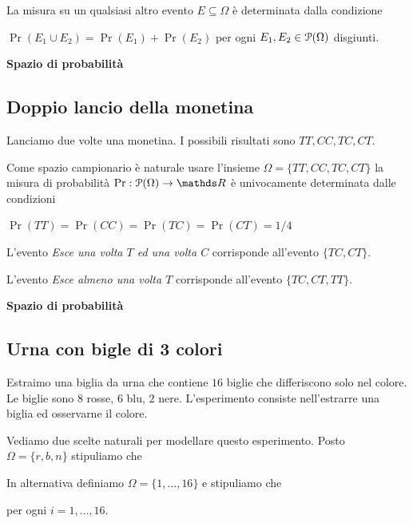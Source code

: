 \documentclass[11pt,openany]{book}
\def\RR{\mathds R}
\def\P{\EuScript P}
\begin{document}
La misura su un qualsiasi altro evento $E\subseteq\Omega$ è determinata dalla condizione 

$\Pr(E_1\cup E_2)=\Pr(E_1)+\Pr(E_2)$ per ogni $E_1,E_2\in\P(\Omega)$ disgiunti.



\clearpage\hfill\textbf{Spazio di probabilità}
\subsection{Doppio lancio della monetina}
\label{doppo_lancio_moneta}

Lanciamo due volte una monetina. I possibili risultati sono $TT, CC, TC, CT$. 

Come spazio campionario è naturale usare l'insieme $\Omega=\{TT, CC, TC, CT\}$ la misura di probabilità $\Pr:\P(\Omega)\to\RR$ è univocamente determinata dalle condizioni

$\Pr(TT)=\Pr(CC)=\Pr(TC)=\Pr(CT)=1/4$

L'evento \textit{Esce una volta $T$ ed una volta $C$\/} corrisponde all'evento $\{TC, CT\}$.

L'evento \textit{Esce almeno una volta $T$\/} corrisponde all'evento $\{TC, CT, TT\}$.



\clearpage\hfill\textbf{Spazio di probabilità}
\subsection{Urna con bigle di 3 colori}
\label{urna_3_colori}

Estraimo una biglia da urna che contiene $16$ biglie che differiscono solo nel colore.
Le biglie sono $8$ rosse, $6$ blu, $2$ nere.
L'esperimento consiste nell'estrarre una biglia ed osservarne il colore.

Vediamo due scelte naturali per modellare questo esperimento. 
Posto $\Omega=\{r,b,n\}$ stipuliamo che




In alternativa definiamo $\Omega=\{1,\dots,16\}$ e 
stipuliamo che 

\hfil per ogni $i=1,\dots,16$.



\end{document}
